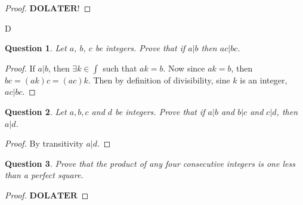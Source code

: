 \documentclass[11pt,oneside]{article}
\newtheorem{question}{Question}
\begin{document}
\begin{proof}
	$\mathbf{DO LATER!}$
\end{proof}
D
\begin{question}
	Let $a$, $b$, $c$ be integers. Prove that if $a | b$ then $ac | bc$.
\end{question}
\begin{proof}
	If $a | b$, then $\exists k \in \int$ such that $ak = b$.
	Now since $ak = b$, then $bc = (ak)c = (ac)k$. Then by definition of divisibility, sine $k$ is an integer, $ac|bc$.
\end{proof}

\begin{question}
	Let $a, b, c$ and $d$ be integers. Prove that if $a|b$ and $b|c$ and $c|d$, then $a|d$.
\end{question}
\begin{proof}
	By transitivity $a|d$.
\end{proof}

\begin{question}
	Prove that the product of any four consecutive integers is one less than a perfect square.
\end{question}
\begin{proof}
	$\mathbf{DO LATER}$
\end{proof}
\end{document}

